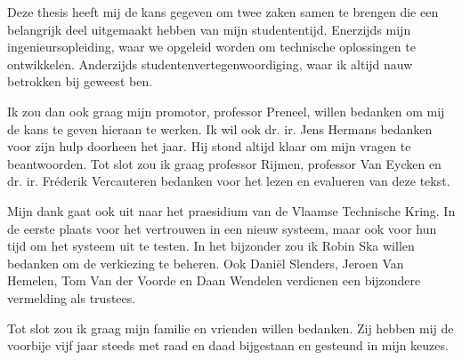 % 
%

Deze thesis heeft mij de kans gegeven om twee zaken samen te brengen die een belangrijk deel uitgemaakt hebben van mijn studententijd. Enerzijds mijn ingenieursopleiding, waar we opgeleid worden om technische oplossingen te ontwikkelen. Anderzijds studentenvertegenwoordiging, waar ik altijd nauw betrokken bij geweest ben.

\npar Ik zou dan ook graag mijn promotor, professor Preneel, willen bedanken om mij de kans te geven hieraan te werken. Ik wil ook dr. ir. Jens Hermans bedanken voor zijn hulp doorheen het jaar. Hij stond altijd klaar om mijn vragen te beantwoorden. Tot slot zou ik graag professor Rijmen, professor Van Eycken en dr. ir. Fréderik Vercauteren bedanken voor het lezen en evalueren van deze tekst.

\npar Mijn dank gaat ook uit naar het praesidium van de Vlaamse Technische Kring. In de eerste plaats voor het vertrouwen in een nieuw systeem, maar ook voor hun tijd om het systeem uit te testen. In het bijzonder zou ik Robin Ska willen bedanken om de verkiezing te beheren. Ook Dani\"el Slenders, Jeroen Van Hemelen, Tom Van der Voorde en Daan Wendelen verdienen een bijzondere vermelding als trustees.

\npar Tot slot zou ik graag mijn familie en vrienden willen bedanken. Zij hebben mij de voorbije vijf jaar steeds met raad en daad bijgestaan en gesteund in mijn keuzes.